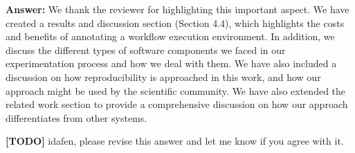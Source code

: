 \documentclass{letter}
\newcommand{\todo}[1]{%
      \color{red}\textbf{[TODO]} #1\color{black}}
\newcommand{\answer}[1]{%
      \textbf{Answer:} #1}
\begin{document}
\begin{letter}{}
\answer{We thank the reviewer for highlighting this important aspect. We have created a results and discussion section (Section 4.4), which highlights the costs and benefits of annotating a workflow execution environment. In addition, we discuss the different types of software components we faced in our experimentation process and how we deal with them. We have also included a discussion on how reproducibility is approached in this work, and how our approach might be used by the scientific community. We have also extended the related work section to provide a comprehensive discussion on how our approach differentiates from other systems.

\todo{idafen, please revise this answer and let me know if you agree with it.}}


\end{letter}
\end{document}

